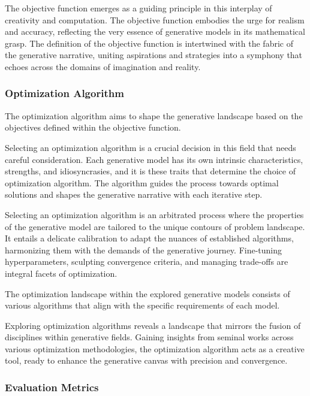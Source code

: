 The objective function emerges as a guiding principle in this interplay of creativity and computation. The objective function embodies the urge for realism and accuracy, reflecting the very essence of generative models in its mathematical grasp. The definition of the objective function is intertwined with the fabric of the generative narrative, uniting aspirations and strategies into a symphony that echoes across the domains of imagination and reality.

\subsubsection{Optimization Algorithm}

The optimization algorithm aims to shape the generative landscape based on the objectives defined within the objective function.

Selecting an optimization algorithm is a crucial decision in this field that needs careful consideration. Each generative model has its own intrinsic characteristics, strengths, and idiosyncrasies, and it is these traits that determine the choice of optimization algorithm. The algorithm guides the process towards optimal solutions and shapes the generative narrative with each iterative step.

Selecting an optimization algorithm is an arbitrated process where the properties of the generative model are tailored to the unique contours of problem landscape. It entails a delicate calibration to adapt the nuances of established algorithms, harmonizing them with the demands of the generative journey. Fine-tuning hyperparameters, sculpting convergence criteria, and managing trade-offs are integral facets of optimization.

The optimization landscape within the explored generative models consists of various algorithms that align with the specific requirements of each model.

Exploring optimization algorithms reveals a landscape that mirrors the fusion of disciplines within generative fields. Gaining insights from seminal works across various optimization methodologies, the optimization algorithm acts as a creative tool, ready to enhance the generative canvas with precision and convergence.

\subsubsection{Evaluation Metrics}

